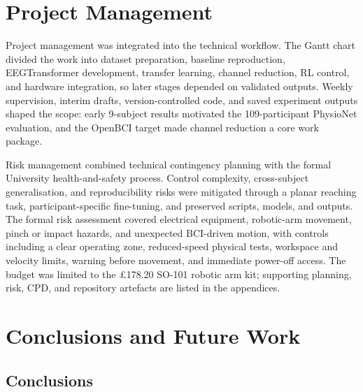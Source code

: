 \documentclass[12pt, a4paper]{article}
\begin{document}
\section{Project Management}

Project management was integrated into the technical workflow. The Gantt chart divided the work into dataset preparation, baseline reproduction, EEGTransformer development, transfer learning, channel reduction, RL control, and hardware integration, so later stages depended on validated outputs. Weekly supervision, interim drafts, version-controlled code, and saved experiment outputs shaped the scope: early 9-subject results motivated the 109-participant PhysioNet evaluation, and the OpenBCI target made channel reduction a core work package.

Risk management combined technical contingency planning with the formal University health-and-safety process. Control complexity, cross-subject generalisation, and reproducibility risks were mitigated through a planar reaching task, participant-specific fine-tuning, and preserved scripts, models, and outputs. The formal risk assessment covered electrical equipment, robotic-arm movement, pinch or impact hazards, and unexpected BCI-driven motion, with controls including a clear operating zone, reduced-speed physical tests, workspace and velocity limits, warning before movement, and immediate power-off access. The budget was limited to the \pounds178.20 SO-101 robotic arm kit; supporting planning, risk, CPD, and repository artefacts are listed in the appendices.

\section{Conclusions and Future Work}

\subsection{Conclusions}
\end{document}
